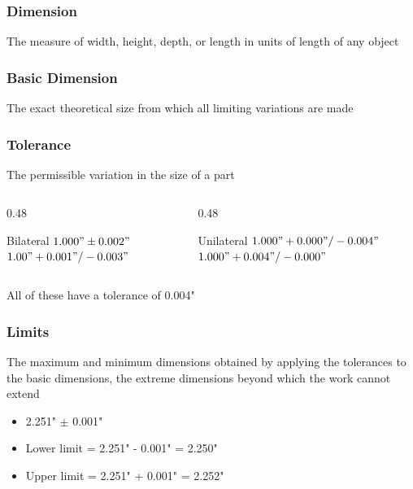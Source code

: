 \begin{frame}
	\frametitle{Dimension}

    The measure of width, height, depth, or length in units of length of any object
\end{frame}

\begin{frame}
	\frametitle{Basic Dimension}
    
    The exact theoretical size from which all limiting variations are made 
\end{frame}

\begin{frame}
	\frametitle{Tolerance}
    
    The permissible variation in the size of a part
    
    \begin{columns}[t]
        \begin{column}{0.48\linewidth}
            \begin{block}{Bilateral}
                $1.000" \pm 0.002"$
                $1.00" +0.001"/-0.003"$
            \end{block}
        \end{column}
        \begin{column}{0.48\linewidth}
            \begin{block}{Unilateral}
                $1.000" +0.000"/-0.004"$
                $1.000" +0.004"/-0.000"$
            \end{block}
        \end{column}
    \end{columns}
    \vspace{1em}
    \centering
    All of these have a tolerance of 0.004"
\end{frame}

\begin{frame}
	\frametitle{Limits}

    The maximum and minimum dimensions obtained by applying the tolerances to the basic dimensions, the extreme dimensions beyond which the work cannot extend

    \begin{itemize}
        \item{2.251" $\pm$ 0.001"}
        \item{Lower limit = 2.251" - 0.001" = 2.250"}
        \item{Upper limit = 2.251" + 0.001" = 2.252"}
    \end{itemize}  
\end{frame}

